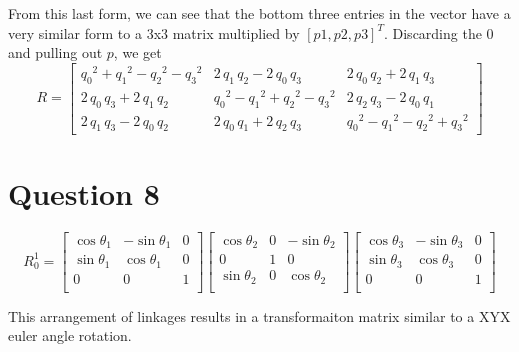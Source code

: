 \documentclass[11pt]{article}
\begin{document}
From this last form, we can see that the bottom three entries in the vector have a 
very similar form to a 3x3 matrix multiplied by $[p1,p2,p3]^T$. Discarding the 0 and pulling out $p$, we get
$$
R = 
\begin{bmatrix}
{q_{0}}^2+{q_{1}}^2-{q_{2}}^2-{q_{3}}^2 & 2\,q_{1}\,q_{2}-2\,q_{0}\,q_{3}         & 2\,q_{0}\,q_{2}+2\,q_{1}\,q_{3}\\
2\,q_{0}\,q_{3}+2\,q_{1}\,q_{2}         & {q_{0}}^2-{q_{1}}^2+{q_{2}}^2-{q_{3}}^2 & 2\,q_{2}\,q_{3}-2\,q_{0}\,q_{1}\\
2\,q_{1}\,q_{3}-2\,q_{0}\,q_{2}         & 2\,q_{0}\,q_{1}+2\,q_{2}\,q_{3}         & {q_{0}}^2-{q_{1}}^2-{q_{2}}^2+{q_{3}}^2
\end{bmatrix} 
$$
\section{Question 8}
$$
R_0^1=
\begin{bmatrix}
    \cos{\theta_1} & -\sin{\theta_1} & 0 \\
    \sin{\theta_1} &\cos{\theta_1} & 0 \\
    0    & 0 & 1 \\
\end{bmatrix}
\begin{bmatrix}
    \cos{\theta_2} & 0 & -\sin{\theta_2} \\
    0    & 1 & 0 \\
    \sin{\theta_2} & 0 &\cos{\theta_2} \\
\end{bmatrix}
\begin{bmatrix}
    \cos{\theta_3} & -\sin{\theta_3} & 0 \\
    \sin{\theta_3} &\cos{\theta_3} & 0 \\
    0    & 0 & 1 \\
\end{bmatrix}
$$

This arrangement of linkages results in a transformaiton matrix similar to a XYX euler angle rotation. 
\end{document}
